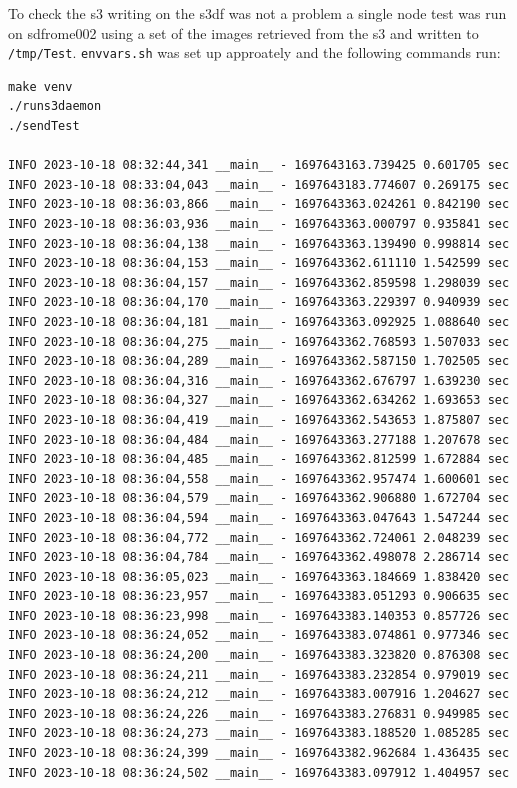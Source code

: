To check the s3 writing on the s3df was not a problem a single node test  was run on sdfrome002 using
a set of the images retrieved from the s3 and written to {\tt /tmp/Test}. {\tt envvars.sh} was set up approately and the following commands run:
\begin{verbatim}
make venv
./runs3daemon
./sendTest

INFO 2023-10-18 08:32:44,341 __main__ - 1697643163.739425 0.601705 sec
INFO 2023-10-18 08:33:04,043 __main__ - 1697643183.774607 0.269175 sec
INFO 2023-10-18 08:36:03,866 __main__ - 1697643363.024261 0.842190 sec
INFO 2023-10-18 08:36:03,936 __main__ - 1697643363.000797 0.935841 sec
INFO 2023-10-18 08:36:04,138 __main__ - 1697643363.139490 0.998814 sec
INFO 2023-10-18 08:36:04,153 __main__ - 1697643362.611110 1.542599 sec
INFO 2023-10-18 08:36:04,157 __main__ - 1697643362.859598 1.298039 sec
INFO 2023-10-18 08:36:04,170 __main__ - 1697643363.229397 0.940939 sec
INFO 2023-10-18 08:36:04,181 __main__ - 1697643363.092925 1.088640 sec
INFO 2023-10-18 08:36:04,275 __main__ - 1697643362.768593 1.507033 sec
INFO 2023-10-18 08:36:04,289 __main__ - 1697643362.587150 1.702505 sec
INFO 2023-10-18 08:36:04,316 __main__ - 1697643362.676797 1.639230 sec
INFO 2023-10-18 08:36:04,327 __main__ - 1697643362.634262 1.693653 sec
INFO 2023-10-18 08:36:04,419 __main__ - 1697643362.543653 1.875807 sec
INFO 2023-10-18 08:36:04,484 __main__ - 1697643363.277188 1.207678 sec
INFO 2023-10-18 08:36:04,485 __main__ - 1697643362.812599 1.672884 sec
INFO 2023-10-18 08:36:04,558 __main__ - 1697643362.957474 1.600601 sec
INFO 2023-10-18 08:36:04,579 __main__ - 1697643362.906880 1.672704 sec
INFO 2023-10-18 08:36:04,594 __main__ - 1697643363.047643 1.547244 sec
INFO 2023-10-18 08:36:04,772 __main__ - 1697643362.724061 2.048239 sec
INFO 2023-10-18 08:36:04,784 __main__ - 1697643362.498078 2.286714 sec
INFO 2023-10-18 08:36:05,023 __main__ - 1697643363.184669 1.838420 sec
INFO 2023-10-18 08:36:23,957 __main__ - 1697643383.051293 0.906635 sec
INFO 2023-10-18 08:36:23,998 __main__ - 1697643383.140353 0.857726 sec
INFO 2023-10-18 08:36:24,052 __main__ - 1697643383.074861 0.977346 sec
INFO 2023-10-18 08:36:24,200 __main__ - 1697643383.323820 0.876308 sec
INFO 2023-10-18 08:36:24,211 __main__ - 1697643383.232854 0.979019 sec
INFO 2023-10-18 08:36:24,212 __main__ - 1697643383.007916 1.204627 sec
INFO 2023-10-18 08:36:24,226 __main__ - 1697643383.276831 0.949985 sec
INFO 2023-10-18 08:36:24,273 __main__ - 1697643383.188520 1.085285 sec
INFO 2023-10-18 08:36:24,399 __main__ - 1697643382.962684 1.436435 sec
INFO 2023-10-18 08:36:24,502 __main__ - 1697643383.097912 1.404957 sec
\end{verbatim}

